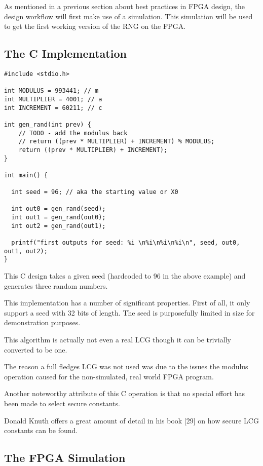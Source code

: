 \documentclass{article}
\begin{document}
    As mentioned in a previous section about best practices in FPGA design,
    the design workflow will first make use of a simulation.
    This simulation will be used to get the first working version of the RNG
    on the FPGA.

    \break

    \subsection{The C Implementation}

    \lstset{language=C}

    \begin{lstlisting}
#include <stdio.h>

int MODULUS = 993441; // m
int MULTIPLIER = 4001; // a
int INCREMENT = 60211; // c

int gen_rand(int prev) {
    // TODO - add the modulus back
    // return ((prev * MULTIPLIER) + INCREMENT) % MODULUS;
    return ((prev * MULTIPLIER) + INCREMENT);
}

int main() {

  int seed = 96; // aka the starting value or X0

  int out0 = gen_rand(seed);
  int out1 = gen_rand(out0);
  int out2 = gen_rand(out1);

  printf("first outputs for seed: %i \n%i\n%i\n%i\n", seed, out0, out1, out2);
}
    \end{lstlisting}

    This C design takes a given seed (hardcoded to 96 in the above example)
    and generates three random numbers.

    This implementation has a number of significant properties.
    First of all, it only support a seed with 32 bits of length.
    The seed is purposefully limited in size for demonstration purposes.

    This algorithm is actually not even a real LCG though it can
    be trivially converted to be one.

    The reason a full fledges LCG was not used was due
    to the issues the modulus operation caused for the non-simulated,
    real world FPGA program.

    Another noteworthy attribute of this C operation is
    that no special effort has been made to select secure constants.

    Donald Knuth offers a great amount of detail in his book [29] on
    how secure LCG constants can be found.

    \subsection{The FPGA Simulation}
\end{document}
